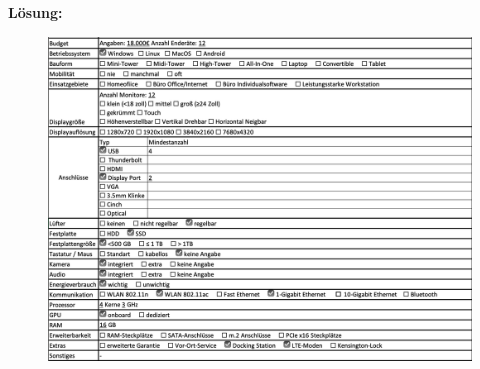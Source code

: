 \documentclass[10pt]{article}
\begin{document}
\begin{flushleft}
\break

\textbf{Lösung:}
\begin{figure}[H]
    \includegraphics[width=\textwidth]{solution-excel.png}
\end{figure}

\end{flushleft}
\end{document}
